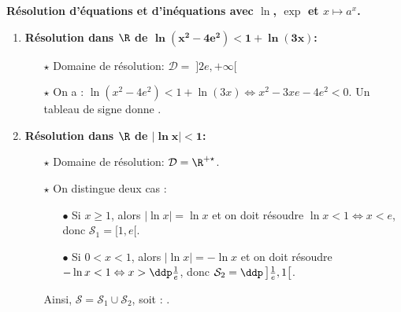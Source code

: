 \begin{correction}  \; \textbf{R\'esolution d'\'equations et d'in\'equations avec $\ln{}$, $\exp{}$ et $x\mapsto a^x$.}


\begin{enumerate}
\item \textbf{R\'esolution dans $\mathbf{\R}$ de $\mathbf{\ln{(x^2-4e^2)}<1+\ln{(3x)}}$:}\\
\noindent \begin{itemize}
\item[$\star$]  Domaine de r\'esolution: $\mathcal{D}= \; \rbrack 2e,+\infty\lbrack$
\item[$\star$]  On a : $\ln{(x^2-4e^2)}<1+\ln{(3x)}\Leftrightarrow x^2-3xe-4e^2<0$. Un tableau de signe donne \fbox{$\mathcal{S}= \; ]2 e, 4 e[$}.
\end{itemize}
\item \textbf{R\'esolution dans $\mathbf{\R}$ de $\mathbf{|\ln{x}|<1}$:}\\
\noindent \begin{itemize}
\item[$\star$]  Domaine de r\'esolution: $\mathcal{D}=\R^{+\star}$.
\item[$\star$]  On distingue deux cas :
\begin{itemize}
\item[$\bullet$] Si $x\geq 1$, alors $|\ln{x}|=\ln{x}$ et on doit r\'esoudre $\ln{x}<1\Leftrightarrow x<e$, donc $\mathcal{S_1}= [1,e[$.
\item[$\bullet$] Si $0<x<1$, alors $|\ln{x}|=-\ln{x}$ et on doit r\'esoudre $-\ln{x}<1 \Leftrightarrow x>\ddp\frac{1}{e}$, donc $\mathcal{S}_2 = \ddp \left]\frac{1}{e} , 1 \right[$.
\end{itemize}
Ainsi, $\mathcal{S}=\mathcal{S}_1 \cup \mathcal{S}_2$, soit : .

\end{itemize}
\end{enumerate}
\end{correction}
